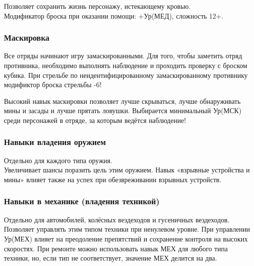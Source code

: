 \documentclass[
]{article}
\begin{document}
Позволяет сохранить жизнь персонажу, истекающему кровью.\\
Модификатор броска при оказании помощи: +Ур(МЕД), сложность 12+.

\subsubsection*{Маскировка}\label{ux43cux430ux441ux43aux438ux440ux43eux432ux43aux430}

Все отряды начинают игру замаскированными. Для того, чтобы заметить
отряд противника, необходимо выполнять наблюдение и проходить проверку с
броском кубика. При стрельбе по неидентифицированному замаскированному
противнику модификтор броска стрельбы -6!

Высокий навык маскировки позволяет лучше скрываться, лучше обнаруживать
мины и засады и лучше прятать ловушки. Выбирается минимальный Ур(МСК)
среди персонажей в отряде, за которым ведётся наблюдение!

\subsubsection*{Навыки владения
оружием}\label{ux43dux430ux432ux44bux43aux438-ux432ux43bux430ux434ux435ux43dux438ux44f-ux43eux440ux443ux436ux438ux435ux43c}

Отдельно для каждого типа оружия.\\
Увеличивает шансы поразить цель этим оружием. Навык «взрывные устройства
и мины» влияет также на успех при обезвреживании взрывных устройств.

\subsubsection*{Навыки в механике (владения
техникой)}\label{ux43dux430ux432ux44bux43aux438-ux432-ux43cux435ux445ux430ux43dux438ux43aux435-ux432ux43bux430ux434ux435ux43dux438ux44f-ux442ux435ux445ux43dux438ux43aux43eux439}

Отдельно для автомобилей, колёсных вездеходов и гусеничных вездеходов.
Позволяет управлять этим типом техники при ненулевом уровне. При
управлении Ур(МЕХ) влияет на преодоление препятствий и сохранение
контроля на высоких скоростях. При ремонте можно использовать навык МЕХ
для любого типа техники, но, если тип не соответствует, значение МЕХ
делится на два.
\end{document}
